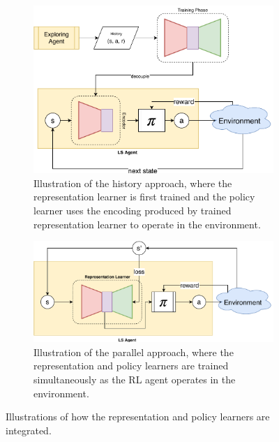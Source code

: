 \begin{figure}[ht!]
	\centering
	\begin{subfigure}{\columnwidth}
		\centering
		\includegraphics[width=\linewidth]{img/history.pdf}
		\caption{Illustration of the history approach, where the representation learner is first trained and the policy learner uses the encoding produced by trained representation learner to operate in the environment.}
		\label{subfig:approach_history}
	\end{subfigure}%
	
	\begin{subfigure}{\columnwidth}
		\centering
		\includegraphics[width=\linewidth]{img/parallel.pdf}
		\caption{Illustration of the parallel approach, where the representation and policy learners are trained simultaneously as the RL agent operates in the environment.}
		\label{subfig:approach_parallel}
	\end{subfigure}
	\caption{Illustrations of how the representation and policy learners are integrated.
	}
	\label{fig:approaches}
\end{figure}

